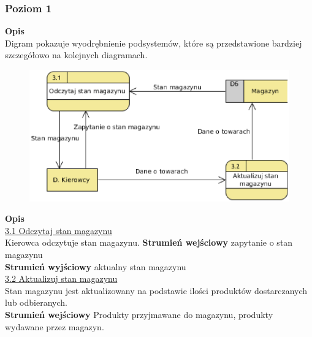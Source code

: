 \subsubsection{Poziom 1}

\clearpage
\begin{figure}[H]
	\centering
	
\end{figure}
\clearpage

\linespread{1.6}

\textbf{Opis}\\
Digram pokazuje wyodrębnienie podsystemów, które są przedstawione bardziej szczegółowo na kolejnych diagramach.


\begin{figure}[H]
	\centering
	\includegraphics[width=\textwidth]{img/DFD3.eps}
\end{figure}

\textbf{Opis} \\
\underline{3.1 Odczytaj stan magazynu}\\
Kierowca odczytuje stan magazynu.
\textbf{Strumień wejściowy} zapytanie o stan magazynu\\
\textbf{Strumień wyjściowy} aktualny stan magazynu\\
\underline{3.2 Aktualizuj stan magazynu}\\ 
Stan magazynu jest aktualizowany na podstawie ilości produktów dostarczanych lub odbieranych.\\	
\textbf{Strumień wejściowy} Produkty przyjmawane do magazynu, produkty wydawane przez magazyn.